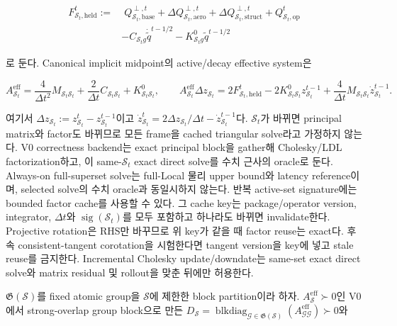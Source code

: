 \documentclass[11pt,a4paper]{article}
\begin{document}
\begin{equation}
\begin{aligned}
  F_{\mathcal S_t,\mathrm{held}}^t
  :=&\;Q_{\mathcal S_t,\mathrm{base}}^{\perp,t}
  +\Delta Q_{\mathcal S_t,\mathrm{aero}}^{\perp,t}
  +\Delta Q_{\mathcal S_t,\mathrm{struct}}^{\perp,t}
  +Q_{\mathcal S_t,\mathrm{op}}^t\\
  &-C_{\mathcal S_tg}\dot{\widetilde q}^{t-1/2}
  -K_{\mathcal S_tg}^{0}\widetilde q^{t-1/2}
\end{aligned}
\end{equation}

로 둔다. Canonical implicit midpoint의 active/decay effective system은

\begin{equation}
  A_{\mathcal S_t}^{\mathrm{eff}}
  =\frac{4}{\Delta t^2}M_{\mathcal S_t\mathcal S_t}
  +\frac{2}{\Delta t}C_{\mathcal S_t\mathcal S_t}
  +K_{\mathcal S_t\mathcal S_t}^{0},
  \qquad
  A_{\mathcal S_t}^{\mathrm{eff}}\Delta z_{\mathcal S_t}
  =2F_{\mathcal S_t,\mathrm{held}}^t
  -2K_{\mathcal S_t\mathcal S_t}^{0}z_{\mathcal S_t}^{t-1}
  +\frac{4}{\Delta t}M_{\mathcal S_t\mathcal S_t}
  \dot z_{\mathcal S_t}^{t-1}.
  \label{eq:local-effective-system}
\end{equation}

여기서 \(\Delta z_{\mathcal S_t}:=z_{\mathcal S_t}^t-z_{\mathcal S_t}^{t-1}\)이고
\(\dot z_{\mathcal S_t}^{t}=2\Delta z_{\mathcal S_t}/\Delta t
-\dot z_{\mathcal S_t}^{t-1}\)다.
\(\mathcal S_t\)가 바뀌면 principal matrix와 factor도 바뀌므로
모든 frame을 cached triangular solve라고 가정하지 않는다.
V0 correctness backend는 exact principal block을 gather해 Cholesky/LDL factorization하고,
이 same-\(\mathcal S_t\) exact direct solve를 수치 근사의 oracle로 둔다.
Always-on full-superset solve는 full-Local 물리 upper bound와 latency reference이며,
selected solve의 수치 oracle과 동일시하지 않는다.
반복 active-set signature에는 bounded factor cache를 사용할 수 있다.
그 cache key는 package/operator version, integrator, \(\Delta t\)와
\(\operatorname{sig}(\mathcal S_t)\)를 모두 포함하고 하나라도 바뀌면 invalidate한다.
Projective rotation은 RHS만 바꾸므로 위 key가 같을 때 factor reuse는 exact다.
후속 consistent-tangent corotation을 시험한다면 tangent version을 key에 넣고 stale reuse를 금지한다.
Incremental Cholesky update/downdate는 same-set exact direct solve와 matrix residual 및 rollout을 맞춘 뒤에만 허용한다.

\(\mathfrak G(\mathcal S)\)를 fixed atomic group을 \(\mathcal S\)에 제한한 block partition이라 하자.
\(A_{\mathcal S}^{\mathrm{eff}}\succ0\)인 V0에서
strong-overlap group block으로 만든
\(D_{\mathcal S}=\operatorname{blkdiag}_{\mathcal G\in\mathfrak G(\mathcal S)}
(A_{\mathcal G\mathcal G}^{\mathrm{eff}})\succ0\)와
\end{document}
